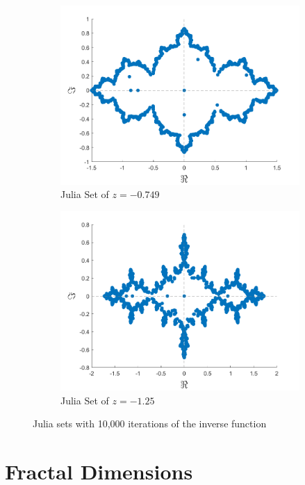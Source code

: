 \documentclass[letterpaper,11pt]{article}
\begin{document}
\begin{figure}
	\begin{subfigure}[b]{0.49\textwidth}
		\includegraphics[width=\textwidth]{../Figures/Julia3.png}
		\caption{Julia Set of $z = - 0.749$}
		\label{fig:J-.749}
	\end{subfigure}
	\begin{subfigure}[b]{0.49\textwidth}
		\includegraphics[width=\textwidth]{../Figures/Julia4.png}
		\caption{Julia Set of $z = -1.25$}
		\label{fig:J-1.25}
	\end{subfigure}
	\caption{Julia sets with 10,000 iterations of the inverse function}
	\label{fig:Julia}
\end{figure}

\section{Fractal Dimensions}
\end{document}
